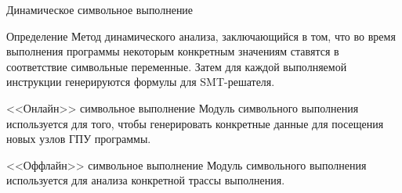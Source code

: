 \documentclass[10pt]{beamer}
\begin{document}

\begin{frame}{Динамическое символьное выполнение}
  \begin{block}{Определение}
    Метод динамического анализа, заключающийся в том, что во время выполнения программы некоторым конкретным значениям ставятся в соответствие символьные переменные. Затем для каждой выполняемой инструкции генерируются формулы для SMT-решателя.
  \end{block}
  \begin{block}{<<Онлайн>> символьное выполнение}
    Модуль символьного выполнения используется для того, чтобы генерировать конкретные данные для посещения новых узлов ГПУ программы.
  \end{block}
  \begin{block}{<<Оффлайн>> символьное выполнение}
    Модуль символьного выполнения используется для анализа конкретной трассы выполнения. \checkmark
  \end{block}
\end{frame}
\end{document}
